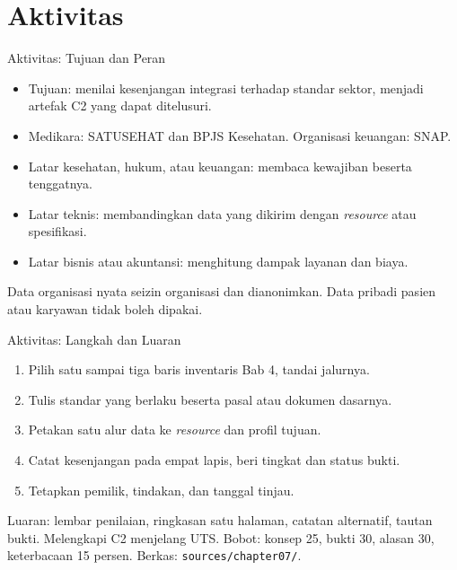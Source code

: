 \documentclass[aspectratio=169, table, 12pt]{beamer}
\begin{document}
\section{Aktivitas}

\begin{frame}{{\Large Aktivitas: Tujuan dan Peran}}
  \vspace{6pt}
  \begin{itemize}
    \item Tujuan: menilai kesenjangan integrasi terhadap standar sektor, menjadi artefak C2 yang dapat ditelusuri.
    \item Medikara: SATUSEHAT dan BPJS Kesehatan. Organisasi keuangan: SNAP.
    \item Latar kesehatan, hukum, atau keuangan: membaca kewajiban beserta tenggatnya.
    \item Latar teknis: membandingkan data yang dikirim dengan \textit{resource} atau spesifikasi.
    \item Latar bisnis atau akuntansi: menghitung dampak layanan dan biaya.
  \end{itemize}
  \vspace{4pt}
  {\small Data organisasi nyata seizin organisasi dan dianonimkan. Data pribadi pasien atau karyawan tidak boleh dipakai.}
\end{frame}

\begin{frame}{{\Large Aktivitas: Langkah dan Luaran}}
  \vspace{4pt}
  \begin{enumerate}
    \item Pilih satu sampai tiga baris inventaris Bab 4, tandai jalurnya.
    \item Tulis standar yang berlaku beserta pasal atau dokumen dasarnya.
    \item Petakan satu alur data ke \textit{resource} dan profil tujuan.
    \item Catat kesenjangan pada empat lapis, beri tingkat dan status bukti.
    \item Tetapkan pemilik, tindakan, dan tanggal tinjau.
  \end{enumerate}
  \vspace{4pt}
  {\small Luaran: lembar penilaian, ringkasan satu halaman, catatan alternatif, tautan bukti. Melengkapi C2 menjelang UTS. Bobot: konsep 25, bukti 30, alasan 30, keterbacaan 15 persen. Berkas: \texttt{sources/chapter07/}.}
\end{frame}
\end{document}
